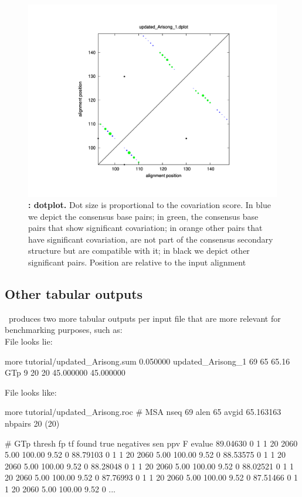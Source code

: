 \begin{figure}
  \includegraphics[scale=0.60]{Arisong_dplot.pdf}
\caption{\small\textbf{:
    dotplot.}  Dot size is proportional to the covariation score. In
  blue we depict the consensus base pairs; in green, the consensus
  base pairs that show significant covariation; in orange other pairs
  that have significant covariation, are not part of the consensus
  secondary structure but are compatible with it; in black we depict
  other significant pairs.  Position are relative to the input alignment}
\label{fig:dplot}
\end{figure}



\clearpage
\subsection{Other tabular outputs}

\rscape\ produces two more tabular outputs per input file that are
more relevant for benchmarking purposes, such as:\\

File  looks lie:

\begin{sreoutput}
more tutorial/updated_Arisong.sum 
0.050000        updated_Arisong_1       69      65      65.16    GTp 9 20 20 45.000000 45.000000 
\end{sreoutput}


File  looks like:
\begin{sreoutput}
more tutorial/updated_Arisong.roc
# MSA nseq 69 alen 65 avgid 65.163163 nbpairs 20 (20)

# GTp thresh fp tf found true negatives sen ppv F evalue
89.04630 0 1 1 20 2060 5.00 100.00 9.52 0
88.79103 0 1 1 20 2060 5.00 100.00 9.52 0
88.53575 0 1 1 20 2060 5.00 100.00 9.52 0
88.28048 0 1 1 20 2060 5.00 100.00 9.52 0
88.02521 0 1 1 20 2060 5.00 100.00 9.52 0
87.76993 0 1 1 20 2060 5.00 100.00 9.52 0
87.51466 0 1 1 20 2060 5.00 100.00 9.52 0
...
\end{sreoutput}
